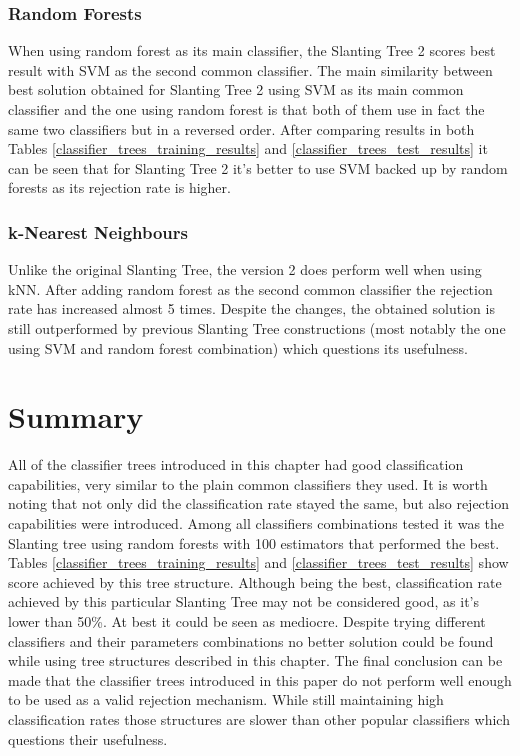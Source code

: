 \subsubsection{Random Forests}

When using random forest as its main classifier, the Slanting Tree 2 scores best result with SVM as the second common classifier. The main similarity between best solution obtained for Slanting Tree 2 using SVM as its main common classifier and the one using random forest is that both of them use in fact the same two classifiers but in a reversed order. After comparing results in both Tables \ref{classifier_trees_training_results} and \ref{classifier_trees_test_results} it can be seen that for Slanting Tree 2 it's better to use SVM backed up by random forests as its rejection rate is higher.

\subsubsection{k-Nearest Neighbours}

Unlike the original Slanting Tree, the version 2 does perform well when using kNN. After adding random forest as the second common classifier the rejection rate has increased almost 5 times. Despite the changes, the obtained solution is still outperformed by previous Slanting Tree constructions (most notably the one using SVM and random forest combination) which questions its usefulness. 

\section{Summary}

All of the classifier trees introduced in this chapter had good classification capabilities, very similar to the plain common classifiers they used. It is worth noting that not only did the classification rate stayed the same, but also rejection capabilities were introduced. Among all classifiers combinations tested it was the Slanting tree using random forests with 100 estimators that performed the best. Tables \ref{classifier_trees_training_results} and \ref{classifier_trees_test_results} show score achieved by this tree structure. Although being the best, classification rate achieved by this particular Slanting Tree may not be considered good, as it's lower than 50\%. At best it could be seen as mediocre. Despite trying different classifiers and their parameters combinations no better solution could be found while using tree structures described in this chapter. The final conclusion can be made that the classifier trees introduced in this paper do not perform well enough to be used as a valid rejection mechanism. While still maintaining high classification rates those structures are slower than other popular classifiers which questions their usefulness.